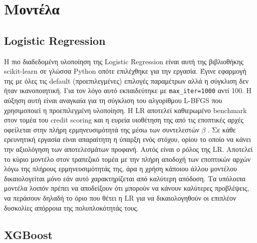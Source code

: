 \section{Μοντέλα}
\label{sec:models}

\subsection{Logistic Regression}
\label{sec:lr}
Η πιο διαδεδομένη υλοποίηση της Logistic Regression είναι αυτή της βιβλιοθήκης 
scikit-learn σε γλώσσα Python οπότε επιλέχθηκε για την εργασία. Έγινε εφαρμογή 
της με όλες τις default (προεπιλεγμένες) επιλογές παραμέτρων αλλά η σύγκλιση 
δεν ήταν ικανοποιητική. Για τον λόγο αυτό εκπαιδεύτηκε με \texttt{max\_iter=1000} 
αντί 100. Η αύξηση αυτή είναι αναγκαία για τη σύγκλιση του αλγορίθμου L-BFGS που χρησιμοποιεί η προεπιλεγμένη υλοποίηση. 
Η LR αποτελεί καθιερωμένο benchmark στον τομέα του credit scoring \citep{hand1997statistical, lessmann2015benchmarking} 
και η ευρεία υιοθέτηση της από τις εποπτικές αρχές οφείλεται στην πλήρη ερμηνευσιμότητά της μέσω των συντελεστών $\beta$ 
\citep{siddiqi2017intelligent}. Σε κάθε ερευνητική εργασία είναι απαραίτητη η ύπαρξη ενός στόχου, 
ορίου το οποίο να κάνει την αξιολόγηση των αποτελεσμάτων προφανή. Αυτός είναι 
ο ρόλος της LR. Αποτελεί το κύριο μοντέλο στον τραπεζικό τομέα με την πλήρη 
αποδοχή των εποπτικών αρχών λόγω της πλήρους ερμηνευσιμότητάς της, άρα η χρήση 
κάποιου άλλου μοντέλου δικαιολογείται μόνο εάν αυτό χαρακτηρίζεται από καλύτερη 
απόδοση. Τα υπόλοιπα μοντέλα λοιπόν πρέπει να αποδείξουν ότι μπορούν να κάνουν 
καλύτερες προβλέψεις, να περάσουν δηλαδή το όριο που θέτει η LR για να 
δικαιολογηθούν οι επιπλέον δυσκολίες απόρροια της πολυπλοκότητάς τους.


\subsection{XGBoost}
\label{sec:xgboost}

